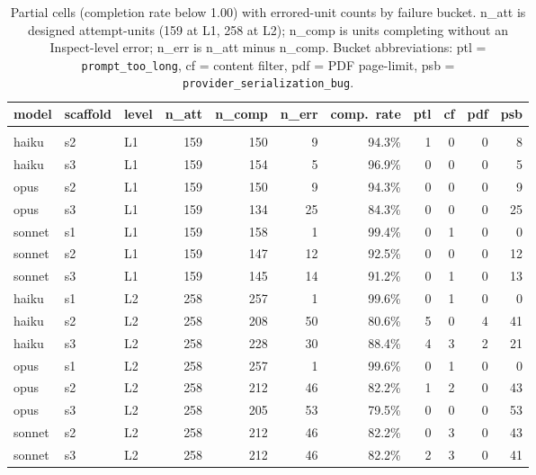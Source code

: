 \documentclass[10pt]{article} %
\begin{document}
    \begin{table}[h]
        \caption{Partial cells (completion rate below 1.00) with errored-unit counts by failure bucket. n\_att is designed attempt-units (159 at L1, 258 at L2); n\_comp is units completing without an Inspect-level error; n\_err is n\_att minus n\_comp. Bucket abbreviations: ptl = \texttt{prompt\_too\_long}, cf = content filter, pdf = PDF page-limit, psb = \texttt{provider\_serialization\_bug}.}
    \label{tab:incomplete_cells}
    \begin{center}
    \small
    \begin{tabular}{lllrrrrrrrr}
        \multicolumn{1}{c}{\bf model} & \multicolumn{1}{c}{\bf scaffold} & \multicolumn{1}{c}{\bf level} & \multicolumn{1}{c}{\bf n\_att} & \multicolumn{1}{c}{\bf n\_comp} & \multicolumn{1}{c}{\bf n\_err} & \multicolumn{1}{c}{\bf comp.\ rate} & \multicolumn{1}{c}{\bf ptl} & \multicolumn{1}{c}{\bf cf} & \multicolumn{1}{c}{\bf pdf} & \multicolumn{1}{c}{\bf psb} \\
        \hline \\
        haiku  & s2 & L1 & 159 & 150 &  9 & 94.3\% & 1 & 0 & 0 &  8 \\
        haiku  & s3 & L1 & 159 & 154 &  5 & 96.9\% & 0 & 0 & 0 &  5 \\
        opus   & s2 & L1 & 159 & 150 &  9 & 94.3\% & 0 & 0 & 0 &  9 \\
        opus   & s3 & L1 & 159 & 134 & 25 & 84.3\% & 0 & 0 & 0 & 25 \\
        sonnet & s1 & L1 & 159 & 158 &  1 & 99.4\% & 0 & 1 & 0 &  0 \\
        sonnet & s2 & L1 & 159 & 147 & 12 & 92.5\% & 0 & 0 & 0 & 12 \\
        sonnet & s3 & L1 & 159 & 145 & 14 & 91.2\% & 0 & 1 & 0 & 13 \\
        haiku  & s1 & L2 & 258 & 257 &  1 & 99.6\% & 0 & 1 & 0 &  0 \\
        haiku  & s2 & L2 & 258 & 208 & 50 & 80.6\% & 5 & 0 & 4 & 41 \\
        haiku  & s3 & L2 & 258 & 228 & 30 & 88.4\% & 4 & 3 & 2 & 21 \\
        opus   & s1 & L2 & 258 & 257 &  1 & 99.6\% & 0 & 1 & 0 &  0 \\
        opus   & s2 & L2 & 258 & 212 & 46 & 82.2\% & 1 & 2 & 0 & 43 \\
        opus   & s3 & L2 & 258 & 205 & 53 & 79.5\% & 0 & 0 & 0 & 53 \\
        sonnet & s2 & L2 & 258 & 212 & 46 & 82.2\% & 0 & 3 & 0 & 43 \\
        sonnet & s3 & L2 & 258 & 212 & 46 & 82.2\% & 2 & 3 & 0 & 41 \\
    \end{tabular}
    \end{center}
    \end{table}
\end{document}
